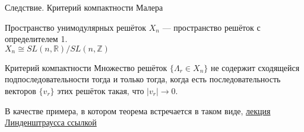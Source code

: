 \documentclass[10pt]{beamer}
\begin{document}
\begin{frame}{Следствие. Критерий компактности Малера}

\begin{block}{Пространство унимодулярных решёток}
    $X_n$ --- пространство решёток с определителем 1.\\
    $X_n \cong SL(n,\mathbb{R})/SL(n,\mathbb{Z})$
\end{block}

\begin{block}{Критерий компактности}
    Множество решёток $\{\Lambda_r \in X_n\}$ не содержит сходящейся подпоследовательности тогда и только тогда, когда есть последовательность векторов $\{v_r\}$ этих решёток такая, что $\left|v_r\right| \rightarrow 0$.
\end{block}

В качестве примера, в котором теорема встречается в таком виде, \href{https://www.claymath.org/library/academy/03LectureNotes/elon.pdf}{лекция Линденштраусса ссылкой}

\end{frame}
\end{document}
